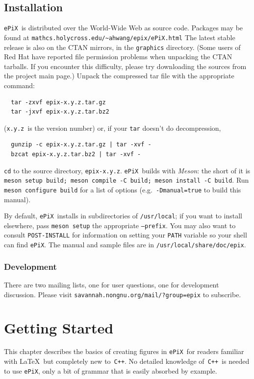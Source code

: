 \documentclass[12pt,letterpaper]{book}
\newcommand{\code}[1]{\texttt{#1}}
\newcommand{\filename}[1]{\texttt{#1}}
\newcommand{\URL}[1]{\texttt{#1}}
\newcommand{\ePiX}{\code{ePiX}}
\newcommand{\CXX}{\code{C++}}
\newcommand{\texinfochapter}[2]{\chapter{#2}}
\begin{document}
\section{Installation}

\ePiX\ is distributed over the World-Wide Web as source code. Packages
may be found at \URL{mathcs.holycross.edu/\~{}ahwang/epix/ePiX.html}
The latest stable release is also on the CTAN mirrors, in the
\code{graphics} directory.  (Some users of Red Hat have reported file
permission problems when unpacking the CTAN tarballs. If you encounter
this difficulty, please try downloading the sources from the project
main page.)  Unpack the compressed tar file with the appropriate
command:
\begin{verbatim}
  tar -zxvf epix-x.y.z.tar.gz
  tar -jxvf epix-x.y.z.tar.bz2
\end{verbatim}
(\code{x.y.z}~is the version number) or, if your \code{tar}
doesn't do decompression,
\begin{verbatim}
  gunzip -c epix-x.y.z.tar.gz | tar -xvf -
  bzcat epix-x.y.z.tar.bz2 | tar -xvf -
\end{verbatim}
\code{cd} to the source directory, \filename{epix-x.y.z}.  \ePiX\ builds
with \emph{Meson}: the short of it is \code{meson setup build; meson
  compile -C build; meson install -C build}.  Run \code{meson configure
  build} for a list of options (e.g.\ \code{-Dmanual=true} to build this
manual).

By default, \ePiX\ installs in subdirectories of
\filename{/usr/local}; if you want to install elsewhere, pass
\code{meson setup} the appropriate \code{--prefix}. You may also
want to consult \filename{POST-INSTALL} for information on setting
your \code{PATH} variable so your shell can find \ePiX.  The manual
and sample files are in \filename{/usr/local/share/doc/epix}.


\subsection{Development}

There are two mailing lists, one for user questions, one for
development discussion. Please visit
\URL{savannah.nongnu.org/mail/?group=epix} to subscribe.


\texinfochapter{2}{Getting Started}
\label{chapter-started}

This chapter describes the basics of creating figures in \ePiX\ for
readers familiar with \LaTeX\ but completely new to~\CXX. No detailed
knowledge of~\CXX\ is needed to use \ePiX, only a bit of grammar that
is easily absorbed by example.
\end{document}
